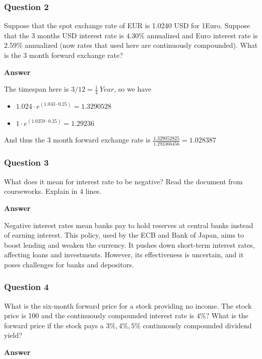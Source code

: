 \documentclass[margin=1in]{article}
\begin{document}
		 \pagebreak
		 
		 \subsubsection*{Question 2}
		 Suppose that the spot exchange rate of EUR is 1.0240 USD for 1Euro. Suppose that the 3 months USD interest rate is $4.30 \%$ annualized and Euro interest rate is $2.59 \%$ annualized (now rates that used here are continuously compounded). What is the 3 month forward exchange rate?
		 
		 \textbf{Answer}
		 
		 The timespan here is $3/12=\frac{1}{4}\ Year$, so we have
		 
		 \begin{itemize}
		 	\item $1.024\cdot e^{\left(1.043\cdot0.25\right)}=1.3290528$
		 	\item $1\cdot e^{\left(1.0259\cdot0.25\right)} = 1.29236$
		 \end{itemize}
	 
	 And thus the 3 month forward exchange rate is $\frac{1.329052825}{1.292366456}=1.028387$
		 
		 
		 \subsubsection*{Question 3}
		 What does it mean for interest rate to be negative? Read the document from courseworks. Explain in 4 lines.
		  
		  \textbf{Answer}
		  
		  Negative interest rates mean banks pay to hold reserves at central banks instead of earning interest. This policy, used by the ECB and Bank of Japan, aims to boost lending and weaken the currency. It pushes down short-term interest rates, affecting loans and investments. However, its effectiveness is uncertain, and it poses challenges for banks and depositors.
		  

		  \subsubsection*{Question 4}
		  What is the six-month forward price for a stock providing no income. The stock price is 100 and the continuously compounded interest rate is $4 \%$? What is the forward price if the stock pays a $3 \%, 4 \%, 5 \%$ continuously compounded dividend yield?
		  
		  \textbf{Answer}
		  
\end{document}
